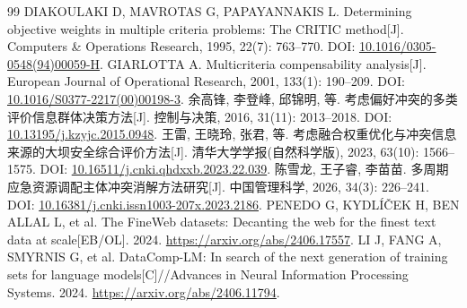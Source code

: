 \documentclass[UTF8,a4paper,12pt]{ctexart}
\begin{document}
\begin{thebibliography}{99}
 DIAKOULAKI D, MAVROTAS G, PAPAYANNAKIS L. Determining objective weights in multiple criteria problems: The CRITIC method[J]. Computers \& Operations Research, 1995, 22(7): 763--770. DOI: \href{https://doi.org/10.1016/0305-0548(94)00059-H}{10.1016/0305-0548(94)00059-H}.
 GIARLOTTA A. Multicriteria compensability analysis[J]. European Journal of Operational Research, 2001, 133(1): 190--209. DOI: \href{https://doi.org/10.1016/S0377-2217(00)00198-3}{10.1016/S0377-2217(00)00198-3}.
 余高锋, 李登峰, 邱锦明, 等. 考虑偏好冲突的多类评价信息群体决策方法[J]. 控制与决策, 2016, 31(11): 2013--2018. DOI: \href{https://doi.org/10.13195/j.kzyjc.2015.0948}{10.13195/j.kzyjc.2015.0948}.
 王雷, 王晓玲, 张君, 等. 考虑融合权重优化与冲突信息来源的大坝安全综合评价方法[J]. 清华大学学报(自然科学版), 2023, 63(10): 1566--1575. DOI: \href{https://doi.org/10.16511/j.cnki.qhdxxb.2023.22.039}{10.16511/j.cnki.qhdxxb.2023.22.039}.
 陈雪龙, 王子睿, 李苗苗. 多周期应急资源调配主体冲突消解方法研究[J]. 中国管理科学, 2026, 34(3): 226--241. DOI: \href{https://doi.org/10.16381/j.cnki.issn1003-207x.2023.2186}{10.16381/j.cnki.issn1003-207x.2023.2186}.
 PENEDO G, KYDLÍČEK H, BEN ALLAL L, et al. The FineWeb datasets: Decanting the web for the finest text data at scale[EB/OL]. 2024. \url{https://arxiv.org/abs/2406.17557}.
 LI J, FANG A, SMYRNIS G, et al. DataComp-LM: In search of the next generation of training sets for language models[C]//Advances in Neural Information Processing Systems. 2024. \url{https://arxiv.org/abs/2406.11794}.
\end{thebibliography}
\end{document}

